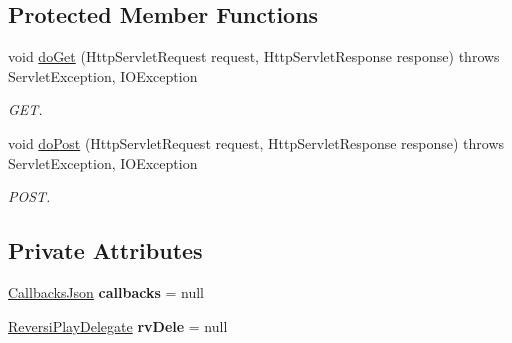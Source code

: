 \subsection*{Protected Member Functions}
\begin{DoxyCompactItemize}
\item 
void \mbox{\hyperlink{classjp_1_1gr_1_1java__conf_1_1yuta__yoshinaga_1_1reversi_1_1controller_1_1_front_controller_a915086fe79bd0246d7b0682691b923d4}{do\+Get}} (Http\+Servlet\+Request request, Http\+Servlet\+Response response)  throws Servlet\+Exception, I\+O\+Exception 
\begin{DoxyCompactList}\small\item\em G\+ET. \end{DoxyCompactList}\item 
void \mbox{\hyperlink{classjp_1_1gr_1_1java__conf_1_1yuta__yoshinaga_1_1reversi_1_1controller_1_1_front_controller_a2f0d63da6e6fc17d2ecf2695af6f8d99}{do\+Post}} (Http\+Servlet\+Request request, Http\+Servlet\+Response response)  throws Servlet\+Exception, I\+O\+Exception 
\begin{DoxyCompactList}\small\item\em P\+O\+ST. \end{DoxyCompactList}\end{DoxyCompactItemize}
\subsection*{Private Attributes}
\begin{DoxyCompactItemize}
\item 
\mbox{\label{classjp_1_1gr_1_1java__conf_1_1yuta__yoshinaga_1_1reversi_1_1controller_1_1_front_controller_aba15286819435469622375192358dee7}} 
\mbox{\hyperlink{classjp_1_1gr_1_1java__conf_1_1yuta__yoshinaga_1_1reversi_1_1model_1_1_callbacks_json}{Callbacks\+Json}} {\bfseries callbacks} = null
\item 
\mbox{\label{classjp_1_1gr_1_1java__conf_1_1yuta__yoshinaga_1_1reversi_1_1controller_1_1_front_controller_a582bcd1cbb69aaf686182d85dbd21f2d}} 
\mbox{\hyperlink{classjp_1_1gr_1_1java__conf_1_1yuta__yoshinaga_1_1reversi_1_1model_1_1_reversi_play_delegate}{Reversi\+Play\+Delegate}} {\bfseries rv\+Dele} = null
\end{DoxyCompactItemize}
